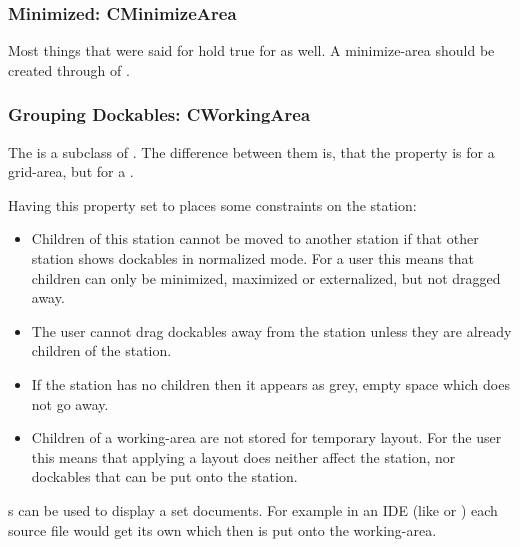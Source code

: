 \subsubsection{Minimized: CMinimizeArea}
Most things that were said for  hold true for  as well. A minimize-area should be created through  of .

\subsubsection{Grouping Dockables: CWorkingArea}
The  is a subclass of . The difference between them is, that the property  is  for a grid-area, but  for a . 

Having this property set to  places some constraints on the station:
\begin{itemize}
\item Children of this station cannot be moved to another station if that other station shows dockables in normalized mode. For a user this means that children can only be minimized, maximized or externalized, but not dragged away.
\item The user cannot drag dockables away from the station unless they are already children of the station.
\item If the station has no children then it appears as grey, empty space which does not go away.
\item Children of a working-area are not stored for temporary layout. For the user this means that applying a layout does neither affect the station, nor dockables that can be put onto the station.
\end{itemize}

s can be used to display a set documents. For example in an IDE (like  or ) each source file would get its own  which then is put onto the working-area.


